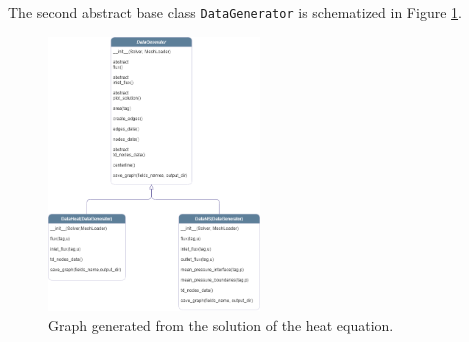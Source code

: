 \documentclass[11pt,a4paper]{article}
\begin{document}
The second abstract base class \texttt{DataGenerator} is schematized in Figure \ref{datagenerator_class}.

\begin{figure}[H]
    \centering
    \includegraphics[width=0.5\textwidth]{Images/datagenerator_class.png}
    \caption{Graph generated from the solution of the heat equation.}
    \label{datagenerator_class}
\end{figure}
\end{document}

